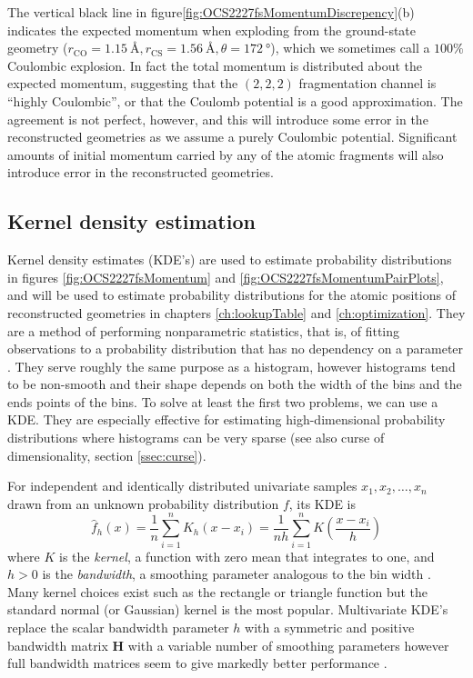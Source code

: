 The vertical black line in figure\ref{fig:OCS2227fsMomentumDiscrepency}(b)  indicates the expected momentum when exploding from the ground-state geometry ($r_\mathrm{CO} = \SI{1.15}{\angstrom}, r_\mathrm{CS} = \SI{1.56}{\angstrom}, \theta = \SI{172}{\degree}$), which we sometimes call a $100\%$ Coulombic explosion. In fact the total momentum is distributed about the expected momentum, suggesting that the  $(2,2,2)$ fragmentation channel is ``highly Coulombic'', or that the Coulomb potential is a good approximation. The agreement is not perfect, however, and this will introduce some error in the reconstructed geometries as we assume a purely Coulombic potential. Significant amounts of initial momentum carried by any of the atomic fragments will also introduce error in the reconstructed geometries.

\subsection{Kernel density estimation} \label{sec:kde}
Kernel density estimates (KDE's) are used to estimate probability distributions in figures \ref{fig:OCS2227fsMomentum} and \ref{fig:OCS2227fsMomentumPairPlots}, and will be used to estimate probability distributions for the atomic positions of reconstructed geometries in chapters \ref{ch:lookupTable} and \ref{ch:optimization}. They are a method of performing nonparametric statistics, that is, of fitting observations to a probability distribution that has no dependency on a parameter \citep[\S 20.2-20.3]{Kendall99}. They serve roughly the same purpose as a histogram, however histograms tend to be non-smooth and their shape depends on both the width of the bins and the ends points of the bins. To solve at least the first two problems, we can use a KDE. They are especially effective for estimating high-dimensional probability distributions where histograms can be very sparse (see also curse of dimensionality, section \ref{ssec:curse}).

For independent and identically distributed univariate samples $x_1, x_2, \dots, x_n$ drawn from an unknown probability distribution $f$, its KDE is
\begin{equation}
\hat{f}_h(x) = \frac{1}{n} \sum_{i=1}^n K_h(x-x_i)
= \frac{1}{nh} \sum_{i=1}^n K\left(\frac{x - x_i}{h}\right)
\end{equation}
where $K$ is the \emph{kernel}, a function with zero mean that integrates to one, and $h > 0$ is the \emph{bandwidth}, a smoothing parameter analogous to the bin width \citep[p. 137]{Scott15}. Many kernel choices exist such as the rectangle or triangle function but the standard normal (or Gaussian) kernel is the most popular. Multivariate KDE's replace the scalar bandwidth parameter $h$ with a symmetric and positive bandwidth matrix $\mathbf{H}$ with a variable number of smoothing parameters \citep{Wand93} however full bandwidth matrices seem to give markedly better performance \citep{Duong03}.

